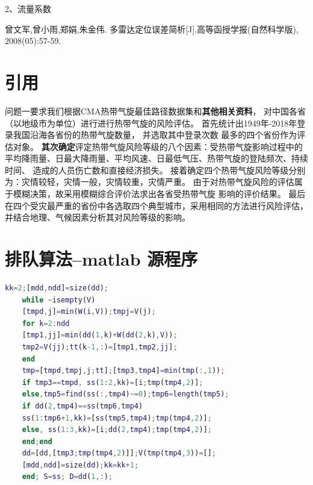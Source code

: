 \documentclass[withoutpreface,bwprint]{cumcmthesis} %
\begin{document}
2、流量系数
   

\begin{thebibliography}{9}%
曾文军,曾小雨,郑娟,朱金伟.
    多雷达定位误差简析[J].高等函授学报(自然科学版),
    2008(05):57-59.

\end{thebibliography}


\newpage
\begin{appendices}
\section{引用}
  问题一要求我们根据CMA热带气旋最佳路径数据集和{\bfseries\heiti 其他相关资料}，
对中国各省（以地级市为单位）{\cu 进行}进行热带气旋的风险评估。
首先统计出1949年-2018年登录我国沿海各省份的热带气旋数量，
并选取其中登录次数 最多的四个省份作为评估对象。
{\bfseries 其次确定}评定热带气旋风险等级的八个因素：{\cu 受热带气旋}影响过程中的
平均降雨量、{\chu 日最大}降雨量、平均风速、日最低气压、热带气旋的登陆频次、持续时间、
造成的人员伤亡数和直接经济损失。
接着确定四个热带气旋风险等级分别为：灾情较轻，灾情一般，灾情较重，灾情严重。
由于对热带气旋风险的评估属于模糊决策，故采用模糊综合评价法求出各省受热带气旋
影响的评价结果。\cite{bib:one}
最后在四个受灾最严重的省份中各选取四个典型城市，采用相同的方法进行风险评估，
并结合地理、气候因素分析其对风险等级的影响。

\section{排队算法--matlab 源程序}
    \begin{lstlisting}[language=matlab]
    kk=2;[mdd,ndd]=size(dd);
    while ~isempty(V)
    [tmpd,j]=min(W(i,V));tmpj=V(j);
    for k=2:ndd
    [tmp1,jj]=min(dd(1,k)+W(dd(2,k),V));
    tmp2=V(jj);tt(k-1,:)=[tmp1,tmp2,jj];
    end
    tmp=[tmpd,tmpj,j;tt];[tmp3,tmp4]=min(tmp(:,1));
    if tmp3==tmpd, ss(1:2,kk)=[i;tmp(tmp4,2)];
    else,tmp5=find(ss(:,tmp4)~=0);tmp6=length(tmp5);
    if dd(2,tmp4)==ss(tmp6,tmp4)
    ss(1:tmp6+1,kk)=[ss(tmp5,tmp4);tmp(tmp4,2)];
    else, ss(1:3,kk)=[i;dd(2,tmp4);tmp(tmp4,2)];
    end;end
    dd=[dd,[tmp3;tmp(tmp4,2)]];V(tmp(tmp4,3))=[];
    [mdd,ndd]=size(dd);kk=kk+1;
    end; S=ss; D=dd(1,:);
    \end{lstlisting}


\end{appendices}
\end{document}
